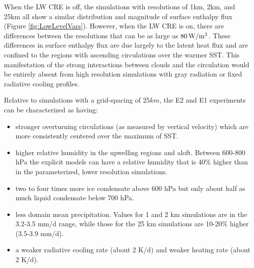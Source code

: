 \documentclass[11pt]{article}   	%
\begin{document}
When the LW CRE is off, the simulations with resolutions of 1km, 2km, and 25km all show a similar 
distribution and magnitude of surface enthalpy flux (Figure \ref{fig:LowLevelVars}).  However, when the 
LW CRE is on, there are differences between the resolutions that can be as large as $80 \, \rm{W/
m^2}$.   These differences in surface enthalpy flux are due largely to the latent heat flux and are 
confined to the regions with ascending circulations over the warmer SST.  This manifestation of the strong interactions between clouds and the circulation 
would be entirely absent from high resolution simulations with gray radiation or fixed radiative cooling profiles.  

Relative to simulations with a grid-spacing of $25 \textit{km}$, the E2 and E1 experiments can be characterized as having: 
\begin{itemize}
  \item stronger overturning circulations (as measured by vertical velocity) which are more consistently centered over the maximum of SST.  
  \item higher relative humidity in the upwelling regions and aloft.   Between 600-800 hPa the explicit models can have a relative humidity 
  that is 40\% higher than in the parameterized, lower resolution simulations.  
  \item two to four times more ice condensate above 600 hPa but only about half as much liquid condensate below 700 hPa.
  \item less domain mean precipitation.  Values for 1 and 2 km simulations are in the 3.2-3.5 mm/d range, while those for the 25 km 
  simulations are 10-20\% higher (3.5-3.9 mm/d).  
  \item a weaker radiative cooling rate (about 2 K/d) and weaker heating rate (about 2 K/d).
\end{itemize}
\end{document}
